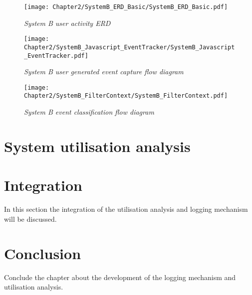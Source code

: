 \begin{figure}[!htb] %
	\centering %
	\texttt{[image: Chapter2/SystemB\_ERD\_Basic/SystemB\_ERD\_Basic.pdf]}
	\caption[System B user activity ERD]
	{\textit{System B user activity ERD}}\label{fig:ch2_SystemB_Basic_ERD}
\end{figure}

\clearpage

\begin{figure}[!htb]
	\centering
	\texttt{[image: Chapter2/SystemB\_Javascript\_EventTracker/SystemB\_Javascript\_EventTracker.pdf]}
	\caption[System B user generated event capture]
	{\textit{System B user generated event capture flow diagram}}\label{fig:CH2_SystemB_EventCapture}
\end{figure}

\clearpage

\begin{figure}[!htb]
	\centering
	\texttt{[image: Chapter2/SystemB\_FilterContext/SystemB\_FilterContext.pdf]}
	\caption[System B event classification]
	{\textit{System B event classification flow diagram}}\label{fig:CH2_SystemB_FilterContext}
\end{figure}

\clearpage

\section{System utilisation analysis}

\section{Integration}
In this section the integration of the utilisation analysis and logging mechanism will be discussed.

\section{Conclusion}
Conclude the chapter about the development of the logging mechanism and utilisation analysis.